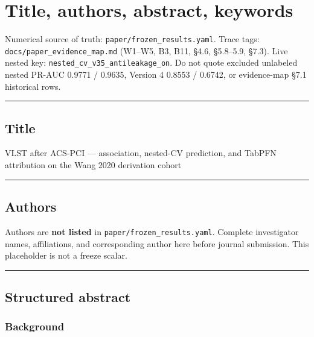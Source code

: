 \documentclass[
]{article}
\author{}
\date{}
\begin{document}
\section{Title, authors, abstract,
keywords}\label{title-authors-abstract-keywords}

Numerical source of truth: \texttt{paper/frozen\_results.yaml}. Trace
tags: \texttt{docs/paper\_evidence\_map.md} (W1--W5, B3, B11, §4.6,
§5.8--5.9, §7.3). Live nested key:
\texttt{nested\_cv\_v35\_antileakage\_on}. Do not quote excluded
unlabeled nested PR-AUC 0.9771 / 0.9635, Version 4 0.8553 / 0.6742, or
evidence-map §7.1 historical rows.

\begin{center}\rule{0.5\linewidth}{0.5pt}\end{center}

\subsection{Title}\label{title}

VLST after ACS-PCI --- association, nested-CV prediction, and TabPFN
attribution on the Wang 2020 derivation cohort

\begin{center}\rule{0.5\linewidth}{0.5pt}\end{center}

\subsection{Authors}\label{authors}

Authors are \textbf{not listed} in \texttt{paper/frozen\_results.yaml}.
Complete investigator names, affiliations, and corresponding author here
before journal submission. This placeholder is not a freeze scalar.

\begin{center}\rule{0.5\linewidth}{0.5pt}\end{center}

\subsection{Structured abstract}\label{structured-abstract}

\subsubsection{Background}\label{background}
\end{document}
